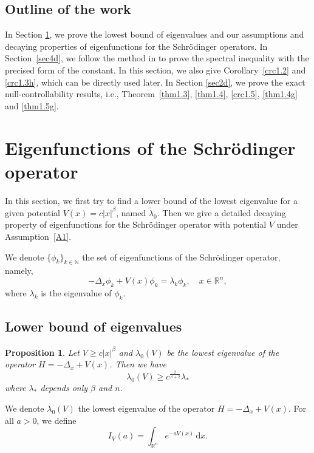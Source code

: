 \documentclass{article}
\numberwithin{equation}{section}
\renewcommand{\d}{\,\mathrm{d}}
\newcommand\N{\ensuremath{\mathbb{N}}}
\newcommand\R{\ensuremath{\mathbb{R}}}
\newtheorem{proposition}[theorem]{Proposition}
\numberwithin{equation}{section}
\theoremstyle{definition}
\begin{document}
\subsection{Outline of the work}

In Section \ref{sec3d}, we prove the lowest bound of eigenvalues and our assumptions and decaying properties of eigenfunctions for the Schrödinger operators. In Section~\ref{sec4d}, we follow the method in \cite{zhu2023spectral} to prove the spectral inequality with the precised form of the constant. In this section, we also give Corollary~\ref{crc1.2} and \ref{crc1.3h}, which can be directly used later. In Section \ref{sec2d}, we prove the exact null-controllability results, i.e., Theorem~\ref{thm1.3}, \ref{thm1.4}, \ref{crc1.5}, \ref{thm1.4g} and \ref{thm1.5g}.  

\section{Eigenfunctions of the Schrödinger operator}\label{sec3d}
In this section, we first try to find a lower bound of the lowest eigenvalue for a given potential $V(x)=c|x|^{\beta}$, named $\widetilde{\lambda}_0$. Then we give a detailed decaying property of eigenfunctions for the Schrödinger operator with potential $V$ under Assumption~\ref{A1}. 

We denote $\{\phi_k\}_{k \in \N}$ the set of eigenfunctions of the Schrödinger operator, namely,
\begin{equation}
	-\Delta_x \phi_k+V(x)\phi_k=\lambda_k \phi_k,\quad x \in \R^{n},
\end{equation}
where $\lambda_k$ is the eigenvalue of $\phi_k$.
\subsection{Lower bound of eigenvalues}\label{subsec3.1}

\begin{proposition}\label{prp2.2c}
	Let $V\ge c|x|^{\beta}$ and $\lambda_0(V)$ be the lowest eigenvalue of the operator $H=-\Delta_x+V(x)$. Then we have 
	\begin{equation}
		\lambda_0(V)\ge c^{\frac{2}{\beta+2}} \lambda_{*}
	\end{equation}
	where $\lambda_{*}$ depends only $\beta$ and $n$.
\end{proposition}
We denote $\lambda_0(V)$ the lowest eigenvalue of the operator $H=-\Delta_x+V(x)$. For all $a>0$, we define
\begin{equation*}
	I_V(a)=\int_{\R^{n}}e^{-a V(x)}\d x.
\end{equation*}
\end{document}
